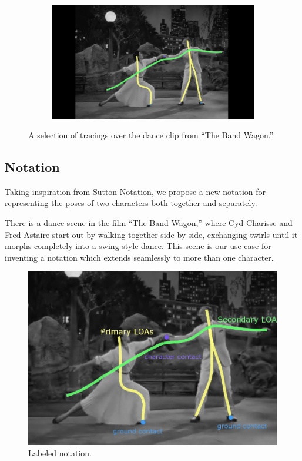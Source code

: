 \begin{figure}[h!]
\begin{subfigure}[b!]{0.31\textwidth}
                \label{fig:pose2}
        \end{subfigure}%
        \quad
        \begin{subfigure}[b!]{0.31\textwidth}
        	\centering
                \includegraphics[width=\linewidth]{img/keyframe_case_7_(4)}
                \label{fig:pose3}
        \end{subfigure}%
	\caption{A selection of tracings over the dance clip from ``The Band Wagon.''}
	\label{fig:tracing}
\end{figure}

\subsection{Notation}
Taking inspiration from Sutton Notation, we propose a new notation for representing the poses of two characters both together and separately.

There is a dance scene in the film ``The Band Wagon,'' where Cyd Charisse and Fred Astaire start out by walking together side by side, exchanging twirls until it morphs completely into a swing style dance. This scene is our use case for inventing a notation which extends seamlessly to more than one character.

\begin{figure}[H]
\centering
\includegraphics[scale=0.5]{img/labelednotation}
\caption{Labeled notation.}
\end{figure}


